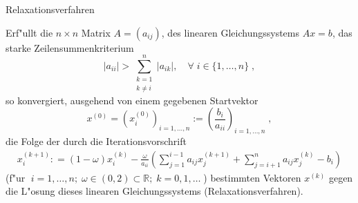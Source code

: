 \begin{exercise}{Relaxationsverfahren}
\begin{body}
Erf"ullt die $n \times n$ Matrix $A=(a_{ij})$, des linearen Gleichungs\-systems $Ax = b$, das starke Zeilensummenkriterium
\begin{equation}
  \label{eq:zeilen}
  |a_{ii}| > \sum_{\substack{k = 1 \\ k \neq i}}^{n} |a_{ik}|, \quad
  \forall \; i \in \{ 1,\ldots, n\} \;,
\end{equation}
so konvergiert, ausgehend von einem gegebenen Startvektor
\begin{equation*}
  x^{(0)} = \left(x_i^{(0)}\right)_{i = 1,\ldots, n} := \left(\frac{b_i}{a_{ii}}\right)_{i = 1,\ldots, n} \;,
\end{equation*}
die Folge der durch die Iterationsvorschrift
\begin{align}
  \label{eq:itter}
  x_i^{(k + 1)} : = (1 - \omega )x_i^{(k)}  - \frac{\omega }{{a_{ii} }}\left(
  {\sum\limits_{j = 1}^{i - 1} {a_{ij} x_j^{(k + 1)}  +
  \sum\limits_{j = i + 1}^n {a_{ij} x_j^{(k)}  - b_i } } } \right)
\end{align}
(f"ur $\; i = 1,\ldots, n; \; \omega \in (0,2) \subset \mathbb{R}; \; k = 0,1,\ldots\;$)
bestimmten Vektoren $x^{(k)}$ gegen die L"osung dieses linearen Gleichungssystems (Relaxationsverfahren).


\end{body}
\end{exercise}
